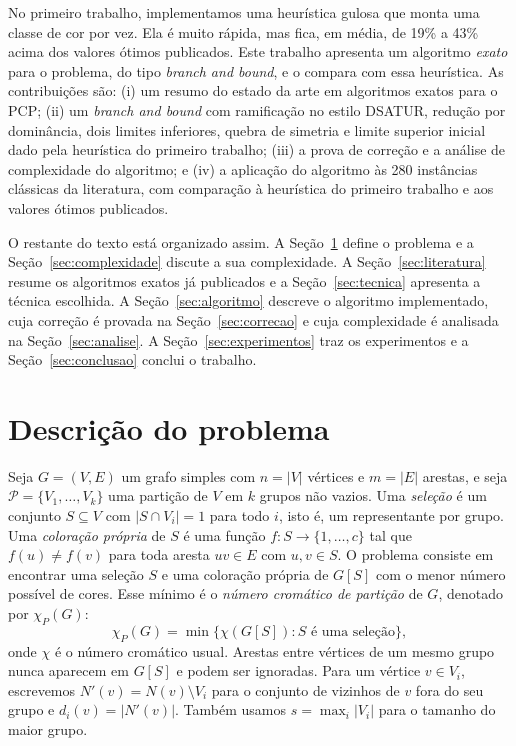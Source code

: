 \documentclass[12pt]{article}
\newcommand{\chiP}{\chi_P}
\begin{document}
No primeiro trabalho, implementamos uma heurística gulosa que monta uma classe
de cor por vez. Ela é muito rápida, mas fica, em média, de 19\% a 43\% acima
dos valores ótimos publicados. Este trabalho apresenta um algoritmo
\emph{exato} para o problema, do tipo \emph{branch and bound}, e o compara com
essa heurística. As contribuições são: (i) um resumo do estado da arte em
algoritmos exatos para o PCP; (ii) um \emph{branch and bound} com ramificação
no estilo DSATUR, redução por dominância, dois limites inferiores, quebra de
simetria e limite superior inicial dado pela heurística do primeiro trabalho;
(iii) a prova de correção e a análise de complexidade do algoritmo; e (iv) a
aplicação do algoritmo às 280 instâncias clássicas da literatura, com
comparação à heurística do primeiro trabalho e aos valores ótimos publicados.

O restante do texto está organizado assim. A Seção~\ref{sec:problema} define o
problema e a Seção~\ref{sec:complexidade} discute a sua complexidade. A
Seção~\ref{sec:literatura} resume os algoritmos exatos já publicados e a
Seção~\ref{sec:tecnica} apresenta a técnica escolhida. A
Seção~\ref{sec:algoritmo} descreve o algoritmo implementado, cuja correção é
provada na Seção~\ref{sec:correcao} e cuja complexidade é analisada na
Seção~\ref{sec:analise}. A Seção~\ref{sec:experimentos} traz os experimentos e
a Seção~\ref{sec:conclusao} conclui o trabalho.

\section{Descrição do problema}\label{sec:problema}

Seja $G=(V,E)$ um grafo simples com $n=|V|$ vértices e $m=|E|$ arestas, e seja
$\mathcal{P}=\{V_1,\dots,V_k\}$ uma partição de $V$ em $k$ grupos não vazios.
Uma \emph{seleção} é um conjunto $S\subseteq V$ com $|S\cap V_i|=1$ para todo
$i$, isto é, um representante por grupo. Uma \emph{coloração própria} de $S$ é
uma função $f:S\to\{1,\dots,c\}$ tal que $f(u)\neq f(v)$ para toda aresta
$uv\in E$ com $u,v\in S$. O problema consiste em encontrar uma seleção $S$ e
uma coloração própria de $G[S]$ com o menor número possível de cores. Esse
mínimo é o \emph{número cromático de partição} de $G$, denotado por $\chiP(G)$:
\[
  \chiP(G)=\min\{\chi(G[S]) : S \text{ é uma seleção}\},
\]
onde $\chi$ é o número cromático usual. Arestas entre vértices de um mesmo grupo
nunca aparecem em $G[S]$ e podem ser ignoradas. Para um vértice $v\in V_i$,
escrevemos $N'(v)=N(v)\setminus V_i$ para o conjunto de vizinhos de $v$ fora
do seu grupo e $d_i(v)=|N'(v)|$. Também usamos $s=\max_i|V_i|$ para o tamanho
do maior grupo.
\end{document}
